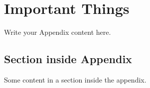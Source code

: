 
\chapter{Important Things} %

\label{AppendixX} %

Write your Appendix content here.

\section{Section inside Appendix}

Some content in a section inside the appendix.